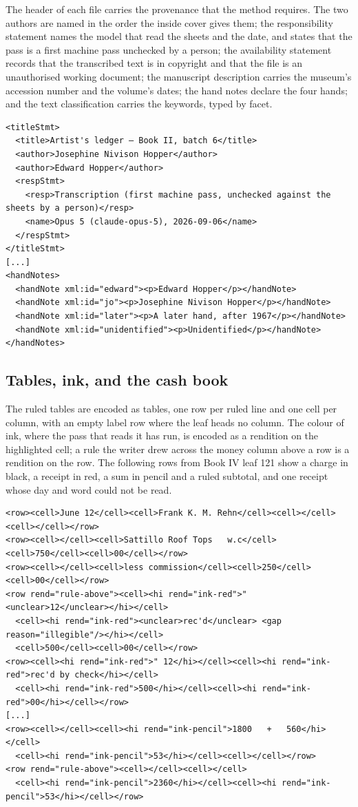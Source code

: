 \documentclass[11pt]{article}
\begin{document}
The header of each file carries the provenance that the method requires. The two authors are named in the order the inside cover gives them; the responsibility statement names the model that read the sheets and the date, and states that the pass is a first machine pass unchecked by a person; the availability statement records that the transcribed text is in copyright and that the file is an unauthorised working document; the manuscript description carries the museum's accession number and the volume's dates; the hand notes declare the four hands; and the text classification carries the keywords, typed by facet.

\begin{lstlisting}
<titleStmt>
  <title>Artist's ledger — Book II, batch 6</title>
  <author>Josephine Nivison Hopper</author>
  <author>Edward Hopper</author>
  <respStmt>
    <resp>Transcription (first machine pass, unchecked against the sheets by a person)</resp>
    <name>Opus 5 (claude-opus-5), 2026-09-06</name>
  </respStmt>
</titleStmt>
[...]
<handNotes>
  <handNote xml:id="edward"><p>Edward Hopper</p></handNote>
  <handNote xml:id="jo"><p>Josephine Nivison Hopper</p></handNote>
  <handNote xml:id="later"><p>A later hand, after 1967</p></handNote>
  <handNote xml:id="unidentified"><p>Unidentified</p></handNote>
</handNotes>
\end{lstlisting}

\subsection{Tables, ink, and the cash book}

The ruled tables are encoded as tables, one row per ruled line and one cell per column, with an empty label row where the leaf heads no column. The colour of ink, where the pass that reads it has run, is encoded as a rendition on the highlighted cell; a rule the writer drew across the money column above a row is a rendition on the row. The following rows from Book IV leaf 121 show a charge in black, a receipt in red, a sum in pencil and a ruled subtotal, and one receipt whose day and word could not be read.

\begin{lstlisting}
<row><cell>June 12</cell><cell>Frank K. M. Rehn</cell><cell></cell><cell></cell></row>
<row><cell></cell><cell>Sattillo Roof Tops   w.c</cell><cell>750</cell><cell>00</cell></row>
<row><cell></cell><cell>less commission</cell><cell>250</cell><cell>00</cell></row>
<row rend="rule-above"><cell><hi rend="ink-red">" <unclear>12</unclear></hi></cell>
  <cell><hi rend="ink-red"><unclear>rec'd</unclear> <gap reason="illegible"/></hi></cell>
  <cell>500</cell><cell>00</cell></row>
<row><cell><hi rend="ink-red">" 12</hi></cell><cell><hi rend="ink-red">rec'd by check</hi></cell>
  <cell><hi rend="ink-red">500</hi></cell><cell><hi rend="ink-red">00</hi></cell></row>
[...]
<row><cell></cell><cell><hi rend="ink-pencil">1800   +   560</hi></cell>
  <cell><hi rend="ink-pencil">53</hi></cell><cell></cell></row>
<row rend="rule-above"><cell></cell><cell></cell>
  <cell><hi rend="ink-pencil">2360</hi></cell><cell><hi rend="ink-pencil">53</hi></cell></row>
\end{lstlisting}
\end{document}
